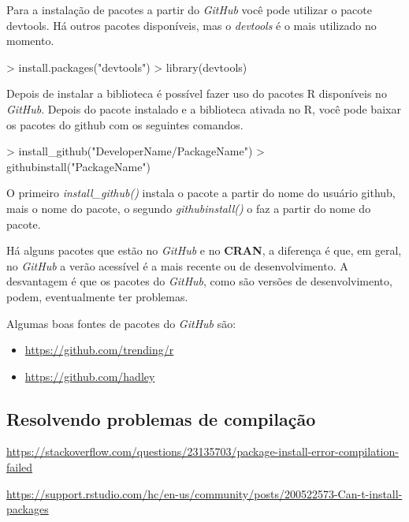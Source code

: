 \documentclass[12pt,a4paper,oneside]{erdc}
\begin{document}
Para a instalação de pacotes a partir do \textit{GitHub} você pode utilizar o pacote devtools. Há outros pacotes disponíveis, mas o \textit{devtools} é o mais utilizado no momento.

\begin{Schunk}
\begin{Sinput}
> install.packages("devtools")
> library(devtools)
\end{Sinput}
\end{Schunk}

Depois de instalar a biblioteca é possível fazer uso do pacotes R disponíveis no \textit{GitHub}. Depois do pacote instalado e a biblioteca ativada no R, você pode baixar os pacotes do github com os seguintes comandos.

\begin{Schunk}
\begin{Sinput}
> install_github("DeveloperName/PackageName")
> githubinstall("PackageName")
\end{Sinput}
\end{Schunk}

O primeiro \textit{install\_github()} instala o pacote a partir do nome do usuário github, mais o nome do pacote, o segundo \textit{githubinstall()} o faz a partir do nome do pacote.

Há alguns pacotes que estão no \textit{GitHub} e no \textbf{CRAN}, a diferença é que, em geral, no \textit{GitHub} a verão acessível é a mais recente ou  de desenvolvimento. A desvantagem é que os pacotes do \textit{GitHub}, como são versões de desenvolvimento, podem, eventualmente ter problemas.

Algumas boas fontes de pacotes do \textit{GitHub} são:

\begin{itemize}
	\item \url{https://github.com/trending/r}
	\item \url{https://github.com/hadley}
\end{itemize}



\subsection{Resolvendo problemas de compilação}

\url{https://stackoverflow.com/questions/23135703/package-install-error-compilation-failed}

\url{https://support.rstudio.com/hc/en-us/community/posts/200522573-Can-t-install-packages}
\end{document}
